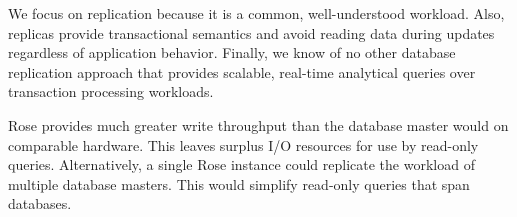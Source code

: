 \documentclass{vldb}
\newcommand{\rows}{Rose\xspace}
\newcommand{\rowss}{Rose's\xspace}
\begin{document}
We focus on replication because it is a common, well-understood
workload.  Also, replicas provide transactional semantics and avoid
reading data during updates regardless of application behavior.
Finally, we know of no other database replication approach that
provides scalable, real-time analytical queries over transaction
processing workloads.

\rows provides much greater write throughput than the database master
would on comparable hardware.  This leaves surplus I/O resources for
use by read-only queries.  Alternatively, a single \rows instance
could replicate the workload of multiple database masters.  This would
simplify read-only queries that span databases.





\end{document}

